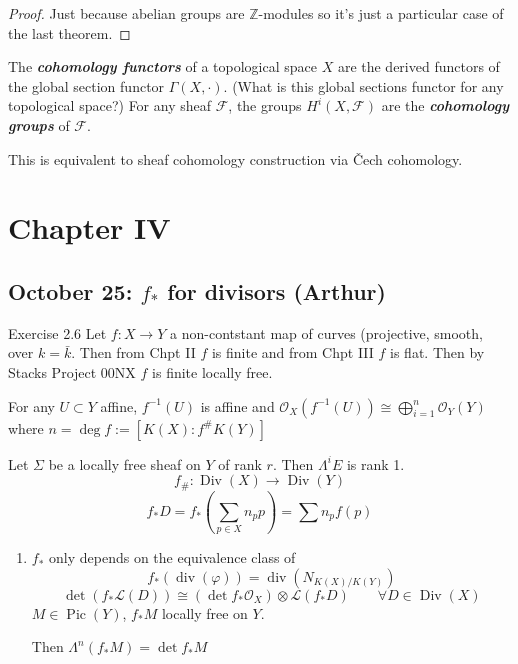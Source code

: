\begin{proof}
	Just because abelian groups are $\mathbb{Z}$-modules so it's just a particular case of the last theorem.
\end{proof}

\begin{defn}
	The \textit{\textbf{cohomology functors}} of a topological space $X$ are the derived functors of the global section functor $\Gamma(X,\cdot)$. {\color{magenta}(What is this global sections functor for any topological space?)} For any sheaf $\mathcal{F}$, the groups $H^{i}(X,\mathcal{F})$ are the \textit{\textbf{cohomology groups}} of  $\mathcal{F}$.
\end{defn}

\begin{remark}
	This is equivalent to sheaf cohomology construction via \v Cech cohomology.
\end{remark}

\chapter{Chapter IV}

\section{October 25: $f_*$ for divisors (Arthur)}

\begin{thing4}{Exercise 2.6}\leavevmode
	Let $f: X \to Y $ a non-contstant map of curves (projective, smooth, over $k=\bar{k}$. Then from Chpt II $f$ is finite and from Chpt III $f$ is flat. Then by Stacks Project 00NX  $f$ is finite locally free.
\end{thing4}

\begin{defn}\leavevmode
	For any $ U\subset Y$ affine, $f^{-1}(U)$ is affine and $\mathcal{O}_X(f^{-1}(U))\cong \bigoplus_{i=1} ^n\mathcal{O}_Y(Y) $ where $n=\operatorname{deg}f:=[K(X):f^\# K(Y)]$
\end{defn}

Let $\Sigma$ be a locally free sheaf on $Y$ of rank $r$. Then $\Lambda^{i}E$ is rank 1.
		\[f_\#:\operatorname{Div}(X)\longrightarrow \operatorname{Div}(Y)\]
	\[f_* D=f_* \left( \sum_{p\in X}n_pp \right) =\sum n_pf(p)\]

\begin{enumerate}[label=\alph*.]
	\item $f_*$ only depends on the equivalence class of 
		\[f_*(\operatorname{div}(\varphi))=\operatorname{div}(N_{K(X)/K(Y)})\]
		\[\det(f_* \mathcal{L}(D))\cong (\det f_* \mathcal{O}_X)\otimes \mathcal{L}(f_* D)\qquad \forall D\in\operatorname{Div}(X)\]
		$M\in\operatorname{Pic}(Y)$, $f_* M$ locally free on $Y$.

		Then $\Lambda^{n}(f_* M)=\det  f_* M$
\end{enumerate}

